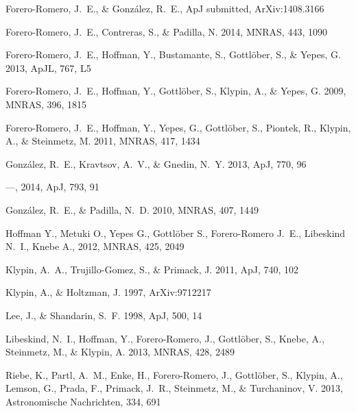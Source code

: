 \documentclass{iau}
\newcommand{\apj}{ApJ}
\newcommand{\apjl}{ApJL}
\newcommand{\mnras}{MNRAS}
\begin{document}
 

\begin{thebibliography}{}


{{Forero-Romero}, J.~E., \& {Gonz{\'a}lez}, R.~E.}, ApJ submitted,
ArXiv:1408.3166 

{Forero-Romero}, J.~E., {Contreras}, S., \& {Padilla}, N. 2014, \mnras, 443,
1090

{Forero-Romero}, J.~E., {Hoffman}, Y., {Bustamante}, S., {Gottl{\"o}ber}, S.,
\& {Yepes}, G. 2013, \apjl, 767, L5

{Forero-Romero}, J.~E., {Hoffman}, Y., {Gottl{\"o}ber}, S., {Klypin}, A., \&
{Yepes}, G. 2009, \mnras, 396, 1815

{Forero-Romero}, J.~E., {Hoffman}, Y., {Yepes}, G., {Gottl{\"o}ber}, S.,
{Piontek}, R., {Klypin}, A., \& {Steinmetz}, M. 2011, \mnras, 417, 1434


{Gonz{\'a}lez}, R.~E., {Kravtsov}, A.~V., \& {Gnedin}, N.~Y. 2013, \apj, 770,
96

---, 2014, \apj, 793, 91


{Gonz{\'a}lez}, R.~E., \& {Padilla}, N.~D. 2010, \mnras, 407, 1449


 {Hoffman} Y., {Metuki} O., {Yepes}
  G., {Gottl{\"o}ber} S., {Forero-Romero} J.~E., {Libeskind} N.~I.,
  {Knebe} A., 2012, \mnras, 425, 2049 

{Klypin}, A.~A., {Trujillo-Gomez}, S., \& {Primack}, J. 2011, \apj,
740, 102

{Klypin}, A., \& {Holtzman}, J. 1997, ArXiv:9712217

{Lee}, J., \& {Shandarin}, S.~F. 1998, \apj, 500, 14

{Libeskind}, N.~I., {Hoffman}, Y., {Forero-Romero}, J., {Gottl{\"o}ber}, S.,
  {Knebe}, A., {Steinmetz}, M., \& {Klypin}, A. 2013, \mnras, 428, 2489

{Riebe}, K., {Partl}, A.~M., {Enke}, H., {Forero-Romero}, J., {Gottl{\"o}ber},
  S., {Klypin}, A., {Lemson}, G., {Prada}, F., {Primack}, J.~R., {Steinmetz},
  M., \& {Turchaninov}, V. 2013, Astronomische Nachrichten, 334, 691



\end{thebibliography}
\end{document}
